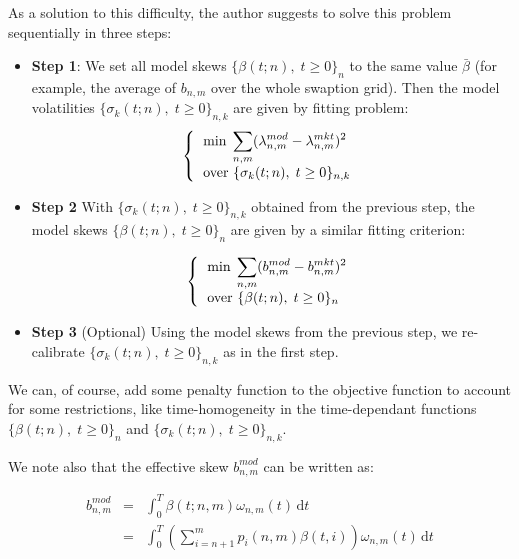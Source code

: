 \documentclass[12pt,a4paper]{article}
\begin{document}
As a solution to this difficulty, the author suggests to solve this problem sequentially in three steps:

\begin{itemize}
 \item \textbf{Step 1}: We set all model skews $\{ \beta(t;n), \; t\geq0\}_{n}$ to the same value $\bar{\beta}$ (for example, the average of $b_{n,m}$ over the whole swaption grid). Then the model volatilities $\{ \sigma_k(t;n), \; t\geq0\}_{n,k}$ are given by fitting problem:
\begin{equation*}
\left\{
\begin{tabular}{l}
    $\displaystyle   \min \; \sum_{n,m} (\lambda^{mod}_{n,m}-\lambda^{mkt}_{n,m})^2$ \\
    over $\{ \sigma_k(t;n), \; t\geq0\}_{n,k}$
\end{tabular}
\right.
\end{equation*}
 
 \item \textbf{Step 2} With $\{ \sigma_k(t;n), \; t\geq0\}_{n,k}$ obtained from the previous step, the model skews $\{ \beta(t;n), \; t\geq0\}_{n}$ are given by a similar fitting criterion:

\begin{equation*}
\left\{
\begin{tabular}{l}
    $\displaystyle   \min \; \sum_{n,m} (b^{mod}_{n,m}-b^{mkt}_{n,m})^2$ \\
    over $\{ \beta(t;n), \; t\geq0\}_{n}$
\end{tabular}
\right.
\end{equation*}
 
 \item \textbf{Step 3} (Optional) Using the model skews from the previous step, we re-calibrate $\{ \sigma_k(t;n), \; t\geq0\}_{n,k}$ as in the first step.
\end{itemize}

We can, of course, add some penalty function to the objective function to account for some restrictions, like time-homogeneity in the time-dependant functions $\{ \beta(t;n), \; t\geq0\}_{n}$ and $\{ \sigma_k(t;n), \; t\geq0\}_{n,k}$.

We note also that the effective skew $b^{mod}_{n,m}$ can be written as:

\begin{eqnarray*}
b^{mod}_{n,m} &=& \int_{0}^T \beta(t; n, m) \omega_{n,m}(t)\, \mathrm dt \\
&=& \int_{0}^T \left( \displaystyle\sum_{i=n+1}^{m} p_i(n,m) \beta(t,i) \right) \omega_{n,m}(t)\, \mathrm dt
\end{eqnarray*}
\end{document}
